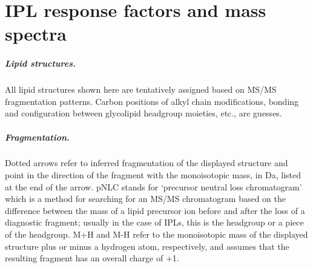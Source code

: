 \chapter{IPL response factors and mass spectra}

\paragraph*{Lipid structures.} All lipid structures shown here are tentatively assigned based on MS/MS fragmentation patterns. Carbon positions of alkyl chain modifications, bonding and configuration between glycolipid headgroup moieties, etc., are guesses.\newline

\paragraph*{Fragmentation.} Dotted arrows refer to inferred fragmentation of the displayed structure and point in the direction of the fragment with the monoisotopic mass, in Da, listed at the end of the arrow. pNLC stands for `precursor neutral loss chromatogram' which is a method for searching for an MS/MS chromatogram based on the difference between the mass of a lipid precursor ion before and after the loss of a diagnostic fragment; usually in the case of IPLs, this is the headgroup or a piece of the headgroup. M+H and M-H refer to the monoisotopic mass of the displayed structure plus or minus a hydrogen atom, respectively, and assumes that the resulting fragment has an overall charge of +1.

\clearpage


